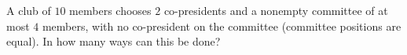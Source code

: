 A club of $10$ members chooses $2$ co-presidents and a nonempty committee of at most $4$ members, with no co-president on the committee (committee positions are equal). In how many ways can this be done?
